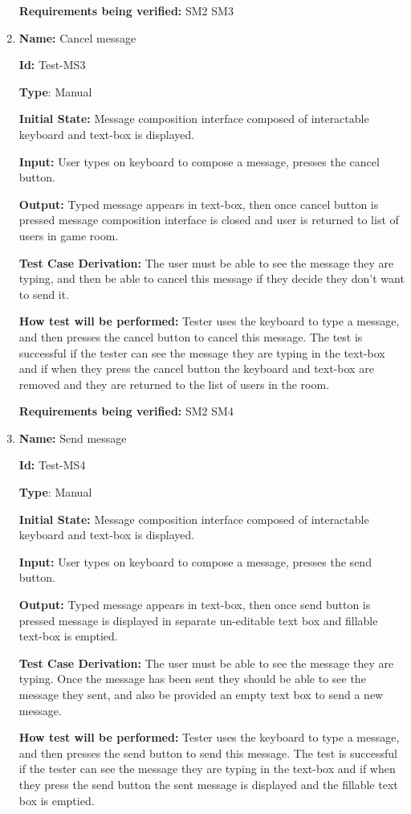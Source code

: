 \documentclass[12pt, titlepage]{article}
\begin{document}
\begin{enumerate}
\textbf{Requirements being verified: } SM2 SM3

\item{\textbf{Name:} Cancel message}

\textbf{Id:} Test-MS3

\textbf{Type}: Manual

\textbf{Initial State:} Message composition interface composed of interactable keyboard and text-box is displayed.

\textbf{Input:} User types on keyboard to compose a message, presses the cancel button.

\textbf{Output:} Typed message appears in text-box, then once cancel button is pressed message composition interface is closed and user is returned to list of users in game room.

\textbf{Test Case Derivation:}
The user must be able to see the message they are typing, and then be able to cancel this message if they decide they don't want to send it.

\textbf{How test will be performed:}
Tester uses the keyboard to type a message, and then presses the cancel button to cancel this message. The test is successful if the tester can see the message they are typing in the text-box and if when they press the cancel button the keyboard and text-box are removed and they are returned to the list of users in the room.

\textbf{Requirements being verified: } SM2 SM4

\item{\textbf{Name:} Send message}

\textbf{Id:} Test-MS4

\textbf{Type}: Manual

\textbf{Initial State:} Message composition interface composed of interactable keyboard and text-box is displayed.

\textbf{Input:} User types on keyboard to compose a message, presses the send button.

\textbf{Output:} Typed message appears in text-box, then once send button is pressed message is displayed in separate un-editable text box and fillable text-box is emptied.

\textbf{Test Case Derivation:}
The user must be able to see the message they are typing. Once the message has been sent they should be able to see the message they sent, and also be provided an empty text box to send a new message.

\textbf{How test will be performed:}
Tester uses the keyboard to type a message, and then presses the send button to send this message. The test is successful if the tester can see the message they are typing in the text-box and if when they press the send button the sent message is displayed and the fillable text box is emptied.


\end{enumerate}
\end{document}

